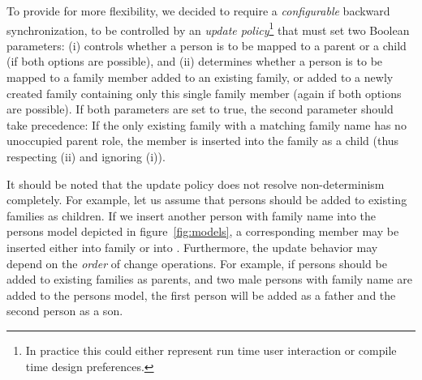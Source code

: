 To provide for more flexibility, we decided to require a \emph{configurable} backward synchronization, to be controlled by an \emph{update policy}\footnote{In practice this could either represent run time user interaction or compile time design preferences.} that must set two Boolean parameters:
(i)  controls whether a person is to be mapped to a parent or a child (if both options are possible), and (ii)  determines whether a person is to be mapped to a family member added to an existing family, or added to a newly created family containing only this single family member (again if both options are possible). 
If both parameters are set to true, the second parameter should take precedence: If the only existing family with a matching family name has no unoccupied parent role, the member is inserted into the family as a child (thus respecting (ii) and ignoring (i)).

It should be noted that the update policy does not resolve non-determinism completely.
For example, let us assume that persons should be added to existing families as children.
If we insert another person with family name  into the persons model depicted in figure~\ref{fig:models}, a corresponding member may be inserted either into family  or into .
Furthermore, the update behavior may depend on the \emph{order} of change operations. For example, if persons should be added to existing families as parents, and two male persons with family name  are added to the persons model, the first person will be added as a father and the second person as a son. 


